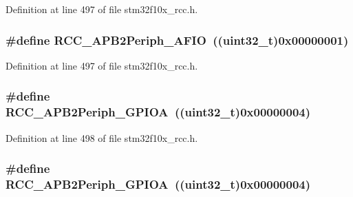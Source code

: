 Definition at line 497 of file stm32f10x\+\_\+rcc.\+h.

\subsubsection[{\texorpdfstring{R\+C\+C\+\_\+\+A\+P\+B2\+Periph\+\_\+\+A\+F\+IO}{RCC_APB2Periph_AFIO}}]{\setlength{\rightskip}{0pt plus 5cm}\#define R\+C\+C\+\_\+\+A\+P\+B2\+Periph\+\_\+\+A\+F\+IO~(({\bf uint32\+\_\+t})0x00000001)}\hypertarget{group___a_p_b2__peripheral_ga5aa9469879ffa019d4836b0d297104c5}{}\label{group___a_p_b2__peripheral_ga5aa9469879ffa019d4836b0d297104c5}


Definition at line 497 of file stm32f10x\+\_\+rcc.\+h.

\subsubsection[{\texorpdfstring{R\+C\+C\+\_\+\+A\+P\+B2\+Periph\+\_\+\+G\+P\+I\+OA}{RCC_APB2Periph_GPIOA}}]{\setlength{\rightskip}{0pt plus 5cm}\#define R\+C\+C\+\_\+\+A\+P\+B2\+Periph\+\_\+\+G\+P\+I\+OA~(({\bf uint32\+\_\+t})0x00000004)}\hypertarget{group___a_p_b2__peripheral_ga44b92fbf2e288796b1acbce2708f3636}{}\label{group___a_p_b2__peripheral_ga44b92fbf2e288796b1acbce2708f3636}


Definition at line 498 of file stm32f10x\+\_\+rcc.\+h.

\subsubsection[{\texorpdfstring{R\+C\+C\+\_\+\+A\+P\+B2\+Periph\+\_\+\+G\+P\+I\+OA}{RCC_APB2Periph_GPIOA}}]{\setlength{\rightskip}{0pt plus 5cm}\#define R\+C\+C\+\_\+\+A\+P\+B2\+Periph\+\_\+\+G\+P\+I\+OA~(({\bf uint32\+\_\+t})0x00000004)}\hypertarget{group___a_p_b2__peripheral_ga44b92fbf2e288796b1acbce2708f3636}{}\label{group___a_p_b2__peripheral_ga44b92fbf2e288796b1acbce2708f3636}


